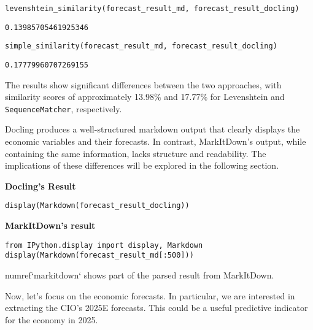 \begin{verbatim}
levenshtein_similarity(forecast_result_md, forecast_result_docling)
\end{verbatim}


\begin{verbatim}
0.13985705461925346
\end{verbatim}



\begin{verbatim}
simple_similarity(forecast_result_md, forecast_result_docling)
\end{verbatim}

\begin{verbatim}
0.17779960707269155
\end{verbatim}


The results show significant differences between the two approaches, with similarity scores of approximately 13.98\% and 17.77\% for Levenshtein and \texttt{SequenceMatcher}, respectively.

Docling produces a well-structured markdown output that clearly displays the economic variables and their forecasts. In contrast, MarkItDown's output, while containing the same information, lacks structure and readability. The implications of these differences will be explored in the following section.

\textbf{Docling's Result}

\begin{verbatim}
display(Markdown(forecast_result_docling))
\end{verbatim}


\textbf{MarkItDown's result}

\begin{verbatim}
from IPython.display import display, Markdown
display(Markdown(forecast_result_md[:500]))
\end{verbatim}

{numref}`markitdown` shows part of the parsed result from MarkItDown.

Now, let's focus on the economic forecasts. In particular, we are interested in extracting the CIO's 2025E forecasts. This could be a useful predictive indicator for the economy in 2025.

